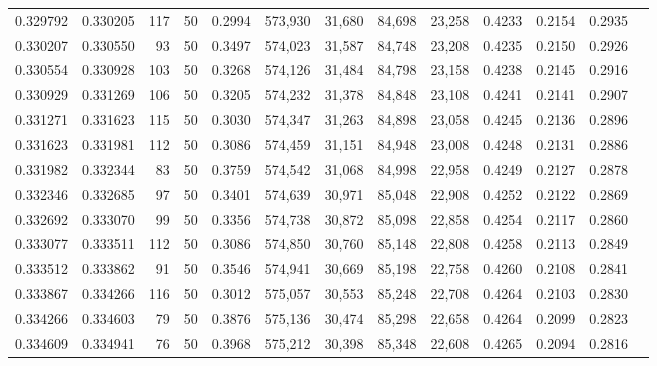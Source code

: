 \begin{tabular}{rrrrrrrrrrrrr}
0.329792 & 0.330205 &   117 &  50 &                                     0.2994 & 573,930 &  31,680 &  84,698 &  23,258 & 0.4233 & 0.2154 & 0.2935 \\
0.330207 & 0.330550 &    93 &  50 &                                     0.3497 & 574,023 &  31,587 &  84,748 &  23,208 & 0.4235 & 0.2150 & 0.2926 \\
0.330554 & 0.330928 &   103 &  50 &                                     0.3268 & 574,126 &  31,484 &  84,798 &  23,158 & 0.4238 & 0.2145 & 0.2916 \\
0.330929 & 0.331269 &   106 &  50 &                                     0.3205 & 574,232 &  31,378 &  84,848 &  23,108 & 0.4241 & 0.2141 & 0.2907 \\
0.331271 & 0.331623 &   115 &  50 &                                     0.3030 & 574,347 &  31,263 &  84,898 &  23,058 & 0.4245 & 0.2136 & 0.2896 \\
0.331623 & 0.331981 &   112 &  50 &                                     0.3086 & 574,459 &  31,151 &  84,948 &  23,008 & 0.4248 & 0.2131 & 0.2886 \\
0.331982 & 0.332344 &    83 &  50 &                                     0.3759 & 574,542 &  31,068 &  84,998 &  22,958 & 0.4249 & 0.2127 & 0.2878 \\
0.332346 & 0.332685 &    97 &  50 &                                     0.3401 & 574,639 &  30,971 &  85,048 &  22,908 & 0.4252 & 0.2122 & 0.2869 \\
0.332692 & 0.333070 &    99 &  50 &                                     0.3356 & 574,738 &  30,872 &  85,098 &  22,858 & 0.4254 & 0.2117 & 0.2860 \\
0.333077 & 0.333511 &   112 &  50 &                                     0.3086 & 574,850 &  30,760 &  85,148 &  22,808 & 0.4258 & 0.2113 & 0.2849 \\
0.333512 & 0.333862 &    91 &  50 &                                     0.3546 & 574,941 &  30,669 &  85,198 &  22,758 & 0.4260 & 0.2108 & 0.2841 \\
0.333867 & 0.334266 &   116 &  50 &                                     0.3012 & 575,057 &  30,553 &  85,248 &  22,708 & 0.4264 & 0.2103 & 0.2830 \\
0.334266 & 0.334603 &    79 &  50 &                                     0.3876 & 575,136 &  30,474 &  85,298 &  22,658 & 0.4264 & 0.2099 & 0.2823 \\
0.334609 & 0.334941 &    76 &  50 &                                     0.3968 & 575,212 &  30,398 &  85,348 &  22,608 & 0.4265 & 0.2094 & 0.2816 \\

\end{tabular}

